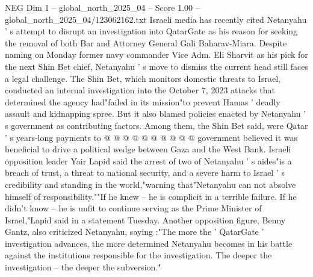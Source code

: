 \begin{textsample}{NEG Dim 1 – global\_north\_2025\_04 – Score 1.00 – global\_north\_2025\_04/123062162.txt}
Israeli media has recently cited Netanyahu ' s attempt to disrupt an investigation into QatarGate as his reason for seeking the removal of both Bar and Attorney General Gali Baharav-Miara.
Despite naming on Monday former navy commander Vice Adm.
Eli Sharvit as his pick for the next Shin Bet chief, Netanyahu ' s move to dismiss the current head still faces a legal challenge.
The Shin Bet, which monitors domestic threats to Israel, conducted an internal investigation into the October 7, 2023 attacks that determined the agency had"failed in its mission"to prevent Hamas ' deadly assault and kidnapping spree.
But it also blamed policies enacted by Netanyahu ' s government as contributing factors.
Among them, the Shin Bet said, were Qatar ' s years-long payments to @ @ @ @ @ @ @ @ @ @ government believed it was beneficial to drive a political wedge between Gaza and the West Bank.
Israeli opposition leader Yair Lapid said the arrest of two of Netanyahu ' s aides"is a breach of trust, a threat to national security, and a severe harm to Israel ' s credibility and standing in the world,"warning that"Netanyahu can not absolve himself of responsibility.""If he knew -- he is complicit in a terrible failure.
If he didn't know -- he is unfit to continue serving as the Prime Minister of Israel,"Lapid said in a statement Tuesday.
Another opposition figure, Benny Gantz, also criticized Netanyahu, saying :"The more the ' QatarGate ' investigation advances, the more determined Netanyahu becomes in his battle against the institutions responsible for the investigation.
The deeper the investigation -- the deeper the subversion."

\end{textsample}
